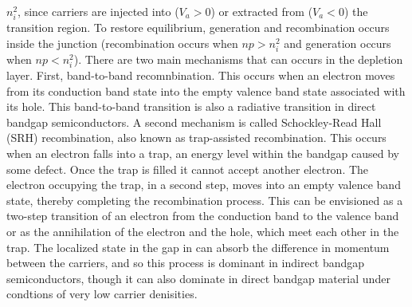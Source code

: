 $n_i^2$, since carriers are injected into ($V_a>0$) or extracted from ($V_a<0$) the transition region. 
To restore equilibrium, generation and recombination occurs inside the junction (recombination occurs when $np > n_i^2$ and generation occurs when $np < n_i^2$).
There are two main mechanisms that can occurs in the depletion layer. First, band-to-band recomnbination. This occurs when an electron
moves from its conduction band state into the empty valence band state associated with its hole. This band-to-band transition is also a radiative transition in direct
bandgap semiconductors. A second mechanism is called Schockley-Read Hall (SRH) recombination, also known as trap-assisted recombination.
This occurs when an electron falls into a trap, an energy level within the bandgap caused by some defect. Once the trap is filled it cannot accept another electron.
The electron occupying the trap, in a second step, moves into an empty valence band state, thereby completing the recombination process. This can be envisioned
as a two-step transition of an electron from the conduction band to the valence band or as the annihilation of the electron and the hole, which meet each other in the trap.
The localized state in the gap in can absorb the difference in momentum between the carriers, and so this process is dominant
in indirect bandgap semiconductors, though it can also dominate in direct bandgap material under condtions of very low 
carrier denisities. 

